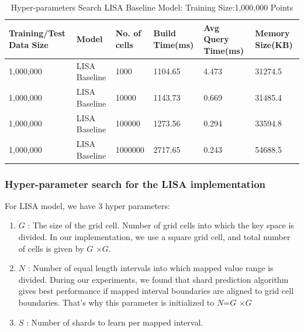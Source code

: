 \begin{table}[ht]
	\centering
	\begin{tabular}{||p{}<{\centering}|p{}<{\centering}| p{}<{\centering}|p{}<{\centering}|p{}<{\centering}|p{}<{\centering}||}
		\hline
		Training/Test Data Size& Model & No. of cells & Build Time(ms) & Avg Query Time(ms) & Memory Size(KB)\\ [0.5ex] 
		\hline
		\hline
		1,000,000& LISA Baseline & 1000 & 1104.65 & 4.473 & 31274.5\\
		\hline
		1,000,000& LISA Baseline & 10000 & 1143.73 & 0.669 & 31485.4\\
		\hline
		1,000,000& LISA Baseline & 100000 & 1273.56 & 0.294 & 33594.8\\
		\hline
		1,000,000& LISA Baseline & 1000000 & 2717.65 & 0.243 & 54688.5\\
		\hline
		\hline
	\end{tabular}
    
	\caption{Hyper-parameters Search LISA Baseline Model: Training Size:1,000,000 Points}
	\label{small_lognormal_lisa_baseline_1000000}
\end{table}



\subsubsection {Hyper-parameter search for the LISA implementation}
For LISA model, we have 3 hyper parameters:
\begin{enumerate}
	\item $G$ : The size of the grid cell. Number of grid cells into which the key space is divided. In our implementation, we use a square grid cell, and total number of cells is given by $G$ $\times G$.
	\item $N$ : Number of equal length intervals into which mapped value range is divided. During our experiments, we found that shard prediction algorithm gives best performance if mapped interval boundaries are aligned to grid cell boundaries. That's why this parameter is initialized to $N$=$G$ $\times G$   
	\item $S$ : Number of shards to learn per mapped interval. 
\end{enumerate}


